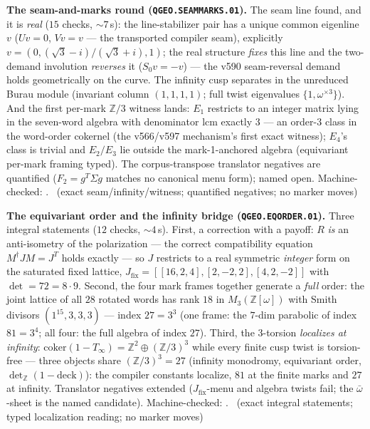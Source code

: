 \documentclass[11pt,a4paper]{article}
\theoremstyle{definition}
\begin{document}
\par\smallskip\noindent\textbf{The seam-and-marks round
(\texttt{QGEO.SEAMMARKS.01}).}
The seam line found, and it is \emph{real} ($15$ checks, ${\sim}7$\,s):
the line-stabilizer pair has a unique common eigenline $v$ ($Uv=0$,
$Vv=v$ --- the transported compiler seam), explicitly
$v=(0,(\sqrt3-i)/(\sqrt3+i),1)$; the real structure \emph{fixes} this
line and the two-demand involution \emph{reverses} it ($S_0v=-v$) ---
the v590 seam-reversal demand holds geometrically on the curve.  The
infinity cusp separates in the unreduced Burau module (invariant
column $(1,1,1,1)$; full twist eigenvalues $\{1,\omega^{\times3}\}$).
And the first per-mark $\mathbb{Z}/3$ witness lands: $E_1$ restricts
to an integer matrix lying in the seven-word algebra with
denominator lcm exactly $3$ --- an order-$3$ class in the word-order
cokernel (the v566/v597 mechanism's first exact witness); $E_4$'s
class is trivial and $E_2/E_3$ lie outside the mark-1-anchored
algebra (equivariant per-mark framing typed).  The corpus-transpose
translator negatives are quantified ($F_2=g^T\Sigma g$ matches no
canonical menu form); named open.
Machine-checked: .
\mE\ (exact seam/infinity/witness; quantified negatives; no marker
moves)
\par\smallskip

\par\smallskip\noindent\textbf{The equivariant order and the infinity
bridge (\texttt{QGEO.EQORDER.01}).}
Three integral statements ($12$ checks, ${\sim}4$\,s).  First, a
correction with a payoff: $R$ \emph{is} an anti-isometry of the
polarization --- the correct compatibility equation
$M^\dagger JM=J^T$ holds exactly --- so $J$ restricts to a real
symmetric \emph{integer} form on the saturated fixed lattice,
$J_{\mathrm{fix}}=[[16,2,4],[2,-2,2],[4,2,-2]]$ with
$\det=72=8\cdot9$.  Second, the four mark frames together generate a
\emph{full} order: the joint lattice of all $28$ rotated words has
rank $18$ in $M_3(\mathbb{Z}[\omega])$ with Smith divisors
$(1^{15},3,3,3)$ --- index $27=3^3$ (one frame: the $7$-dim parabolic
of index $81=3^4$; all four: the full algebra of index $27$).  Third,
the 3-torsion \emph{localizes at infinity}:
$\mathrm{coker}(1-T_\infty)=\mathbb{Z}^2\oplus(\mathbb{Z}/3)^3$ while
every finite cusp twist is torsion-free --- three objects share
$(\mathbb{Z}/3)^3=27$ (infinity monodromy, equivariant order,
$\det_{\mathbb{Z}}(1-\mathrm{deck})$): the compiler constants
localize, $81$ at the finite marks and $27$ at infinity.  Translator
negatives extended ($J_{\mathrm{fix}}$-menu and algebra twists fail;
the $\bar\omega$-sheet is the named candidate).
Machine-checked: .
\mE\ (exact integral statements; typed localization reading; no
marker moves)
\par\smallskip
\end{document}
